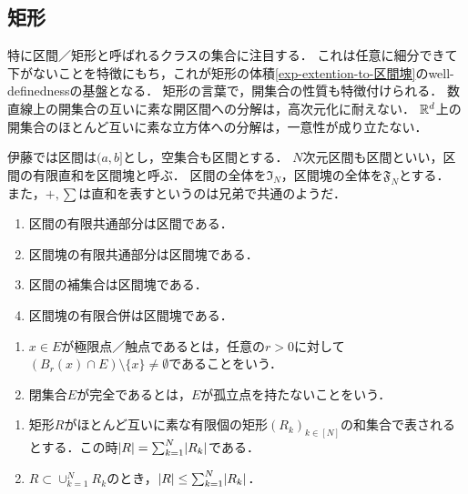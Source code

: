 \documentclass[uplatex, dvipdfmx]{jsreport}
\begin{document}
\subsection{矩形}

\begin{tcolorbox}[colframe=ForestGreen, colback=ForestGreen!10!white,breakable,colbacktitle=ForestGreen!40!white,coltitle=black,fonttitle=\bfseries\sffamily,
    title=伊藤記法]
    特に区間／矩形と呼ばれるクラスの集合に注目する．
    これは任意に細分できて下がないことを特徴にもち，これが矩形の体積\ref{exp-extention-to-区間塊}のwell-definednessの基盤となる．
    矩形の言葉で，開集合の性質も特徴付けられる．
    数直線上の開集合の互いに素な開区間への分解は，高次元化に耐えない．
    $\mathbb{R}^d$上の開集合のほとんど互いに素な立方体への分解は，一意性が成り立たない．

    伊藤\cite{伊藤}では区間は$(a,b]$とし，空集合も区間とする．
    $N$次元区間も区間といい，区間の有限直和を区間塊と呼ぶ．
    区間の全体を$\mathfrak{I}_N$，区間塊の全体を$\mathfrak{F}_N$とする．
    また，$+,\sum$は直和を表すというのは兄弟で共通のようだ．
\end{tcolorbox}

\begin{lemma}\mbox{}
    \begin{enumerate}
        \item 区間の有限共通部分は区間である．
        \item 区間塊の有限共通部分は区間塊である．
        \item 区間の補集合は区間塊である．
        \item 区間塊の有限合併は区間塊である．
    \end{enumerate}
\end{lemma}

\begin{definition}\mbox{}
    \begin{enumerate}
        \item $x\in E$が極限点／触点であるとは，任意の$r>0$に対して$(B_r(x)\cap E)\setminus\{x\}\ne\emptyset$であることをいう．
        \item 閉集合$E$が完全であるとは，$E$が孤立点を持たないことをいう．
    \end{enumerate}
\end{definition}

\begin{lemma}\mbox{}
    \begin{enumerate}
        \item 矩形$R$がほとんど互いに素な有限個の矩形$(R_k)_{k\in[N]}$の和集合で表されるとする．この時$\lvert R\rvert=\sum^N_{k=1}\lvert R_k\rvert$である．
        \item $R\subset\cup_{k=1}^NR_k$のとき，$\lvert R\rvert\le\sum^N_{k=1}\lvert R_k\rvert$．
    \end{enumerate}
\end{lemma}
\end{document}
